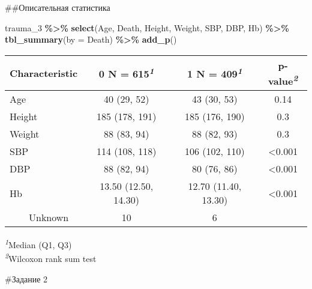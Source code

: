 \documentclass[
]{article}
\newenvironment{Shaded}{\begin{snugshade}}{\end{snugshade}}
\newcommand{\AttributeTok}[1]{\textcolor[rgb]{0.13,0.29,0.53}{#1}}
\newcommand{\CommentTok}[1]{\textcolor[rgb]{0.56,0.35,0.01}{\textit{#1}}}
\newcommand{\DecValTok}[1]{\textcolor[rgb]{0.00,0.00,0.81}{#1}}
\newcommand{\FunctionTok}[1]{\textcolor[rgb]{0.13,0.29,0.53}{\textbf{#1}}}
\newcommand{\NormalTok}[1]{#1}
\newcommand{\OtherTok}[1]{\textcolor[rgb]{0.56,0.35,0.01}{#1}}
\newcommand{\SpecialCharTok}[1]{\textcolor[rgb]{0.81,0.36,0.00}{\textbf{#1}}}
\newcommand{\StringTok}[1]{\textcolor[rgb]{0.31,0.60,0.02}{#1}}
\begin{document}
\#\#Описательная статистика

\begin{Shaded}
\begin{Highlighting}[]
\NormalTok{trauma\_3 }\SpecialCharTok{\%\textgreater{}\%} 
    \FunctionTok{select}\NormalTok{(Age,}
\NormalTok{           Death,}
\NormalTok{           Height,}
\NormalTok{           Weight,}
\NormalTok{           SBP,}
\NormalTok{           DBP,}
\NormalTok{           Hb) }\SpecialCharTok{\%\textgreater{}\%} 
    \FunctionTok{tbl\_summary}\NormalTok{(}\AttributeTok{by =}\NormalTok{ Death) }\SpecialCharTok{\%\textgreater{}\%}
    \FunctionTok{add\_p}\NormalTok{()}
\end{Highlighting}
\end{Shaded}

\begin{table}[!t]
\fontsize{12.0pt}{14.4pt}\selectfont
\begin{tabular*}{\linewidth}{@{\extracolsep{\fill}}lccc}
\toprule
\textbf{Characteristic} & \textbf{0}  N = 615\textsuperscript{\textit{1}} & \textbf{1}  N = 409\textsuperscript{\textit{1}} & \textbf{p-value}\textsuperscript{\textit{2}} \\ 
\midrule\addlinespace[2.5pt]
Age & 40 (29, 52) & 43 (30, 53) & 0.14 \\ 
Height & 185 (178, 191) & 185 (176, 190) & 0.3 \\ 
Weight & 88 (83, 94) & 88 (82, 93) & 0.3 \\ 
SBP & 114 (108, 118) & 106 (102, 110) & <0.001 \\ 
DBP & 88 (82, 94) & 80 (76, 86) & <0.001 \\ 
Hb & 13.50 (12.50, 14.30) & 12.70 (11.40, 13.30) & <0.001 \\ 
    Unknown & 10 & 6 &  \\ 
\bottomrule
\end{tabular*}
\begin{minipage}{\linewidth}
\textsuperscript{\textit{1}}Median (Q1, Q3)\\
\textsuperscript{\textit{2}}Wilcoxon rank sum test\\
\end{minipage}
\end{table}

\#Задание 2

\begin{Shaded}
\end{Shaded}
\end{document}
